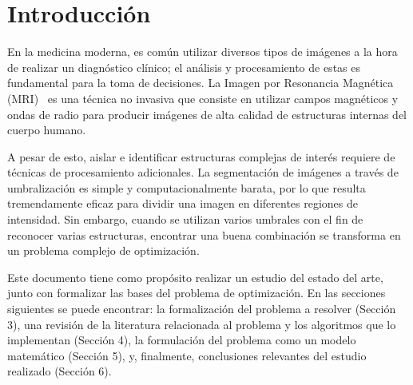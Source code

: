 \documentclass[letter, 10pt]{article}
\begin{document}
\section{Introducci\'on}
En la medicina moderna, es com\'un utilizar diversos tipos de im\'agenes a la hora de realizar un diagn\'ostico cl\'inico;
el an\'alisis y procesamiento de estas es fundamental para la toma de decisiones. La Imagen por Resonancia Magn\'etica (MRI)~\cite{Islam2023MedicalImaging}
es una t\'ecnica no invasiva que consiste en utilizar campos magn\'eticos y ondas de radio para producir im\'agenes de alta calidad de estructuras internas del cuerpo humano.

A pesar de esto, aislar e identificar estructuras complejas de inter\'es requiere de t\'ecnicas de procesamiento adicionales.
La segmentaci\'on de im\'agenes a trav\'es de umbralizaci\'on es simple y computacionalmente barata,
por lo que resulta tremendamente eficaz para dividir una imagen en diferentes regiones de intensidad.
Sin embargo, cuando se utilizan varios umbrales con el fin de reconocer varias estructuras,
encontrar una buena combinaci\'on se transforma en un problema complejo de optimizaci\'on.

Este documento tiene como prop\'osito realizar un estudio del estado del arte,
junto con formalizar las bases del problema de optimizaci\'on.
En las secciones siguientes se puede encontrar:
la formalizaci\'on del problema a resolver (Secci\'on 3),
una revisi\'on de la literatura relacionada al problema y los algoritmos que lo implementan (Secci\'on 4),
la formulaci\'on del problema como un modelo matem\'atico (Secci\'on 5), y, finalmente,
conclusiones relevantes del estudio realizado (Secci\'on 6).
\end{document}
